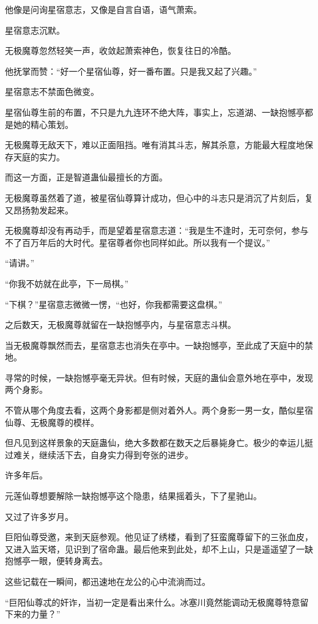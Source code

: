 \begin{this_body}
他像是问询星宿意志，又像是自言自语，语气萧索。

星宿意志沉默。

无极魔尊忽然轻笑一声，收敛起萧索神色，恢复往日的冷酷。

他抚掌而赞：“好一个星宿仙尊，好一番布置。只是我又起了兴趣。”

星宿意志不禁面色微变。

星宿仙尊生前的布置，不只是九九连环不绝大阵，事实上，忘道湖、一缺抱憾亭都是她的精心策划。

无极魔尊无敌天下，难以正面阻挡。唯有消其斗志，解其杀意，方能最大程度地保存天庭的实力。

而这一方面，正是智道蛊仙最擅长的方面。

无极魔尊虽然着了道，被星宿仙尊算计成功，但心中的斗志只是消沉了片刻后，复又昂扬勃发起来。

无极魔尊却没有再动手，而是望着星宿意志道：“我是生不逢时，无可奈何，参与不了百万年后的大时代。星宿尊者你也同样如此。所以我有一个提议。”

“请讲。”

“你我不妨就在此亭，下一局棋。”

“下棋？”星宿意志微微一愣，“也好，你我都需要这盘棋。”

之后数天，无极魔尊就留在一缺抱憾亭内，与星宿意志斗棋。

当无极魔尊飘然而去，星宿意志也消失在亭中。一缺抱憾亭，至此成了天庭中的禁地。

寻常的时候，一缺抱憾亭毫无异状。但有时候，天庭的蛊仙会意外地在亭中，发现两个身影。

不管从哪个角度去看，这两个身影都是侧对着外人。两个身影一男一女，酷似星宿仙尊、无极魔尊的模样。

但凡见到这样景象的天庭蛊仙，绝大多数都在数天之后暴毙身亡。极少的幸运儿挺过难关，继续活下去，自身实力得到夸张的进步。

许多年后。

元莲仙尊想要解除一缺抱憾亭这个隐患，结果摇着头，下了星驰山。

又过了许多岁月。

巨阳仙尊受邀，来到天庭参观。他见证了绣楼，看到了狂蛮魔尊留下的三张血皮，又进入监天塔，见识到了宿命蛊。最后他来到此处，却不上山，只是遥遥望了一缺抱憾亭一眼，便转身离去。

这些记载在一瞬间，都迅速地在龙公的心中流淌而过。

“巨阳仙尊忒的奸诈，当初一定是看出来什么。冰塞川竟然能调动无极魔尊特意留下来的力量？”


\end{this_body}
